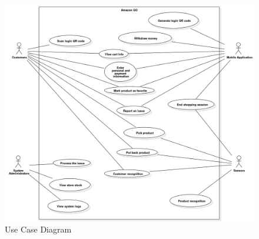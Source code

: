 \documentclass[11pt]{article}
\begin{document}
    \begin{center}
        \begin{figure}[H]
            \includegraphics[width=\linewidth]{Images/UseCaseDiagram.png}
            \caption{Use Case Diagram}
            \label{ucaseDiagram}
        \end{figure}
        \end{center}
\end{document}
